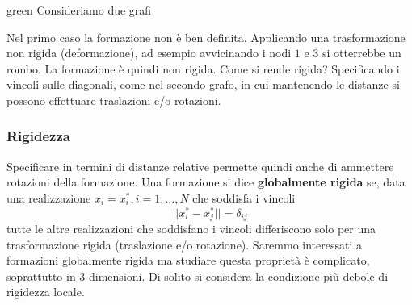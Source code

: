 \begin{mybox}[breakable]{green}{}
Consideriamo due grafi
\begin{center}
\end{center}
Nel primo caso la formazione non \`e ben definita. Applicando una trasformazione non rigida (deformazione), ad esempio avvicinando i nodi $1$ e $3$ si otterrebbe un rombo. La formazione \`e quindi non rigida. Come si rende rigida? Specificando i vincoli sulle diagonali, come nel secondo grafo, in cui mantenendo le distanze si possono effettuare traslazioni e/o rotazioni.
\end{mybox}

\subsubsection{Rigidezza}
Specificare in termini di distanze relative permette quindi anche di ammettere rotazioni della formazione. 
 Una formazione si dice \textbf{globalmente rigida} se, data una realizzazione $x_i = x_i^*, i = 1, \dots, N$ che soddisfa i vincoli
\begin{equation}
||x_i^* - x_j^*|| = \delta_{ij}
\end{equation} tutte le altre realizzazioni che soddisfano i vincoli differiscono solo per una trasformazione rigida (traslazione e/o rotazione).
Saremmo interessati a formazioni globalmente rigida ma studiare questa propriet\`a \`e complicato, soprattutto in $3$ dimensioni. Di solito si considera la condizione pi\`u debole di rigidezza locale.

